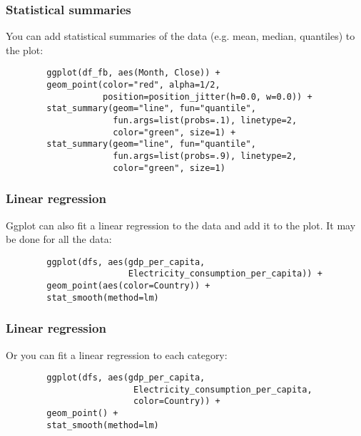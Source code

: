 \documentclass{beamer}
\begin{document}
	\begin{frame}[fragile]
		\frametitle{Statistical summaries}

		You can add statistical summaries of the data (e.g. mean, median, quantiles) to the plot:

		\vspace{2em}
	
		\begin{exampleblock}{}
		\begin{BVerbatim}
		ggplot(df_fb, aes(Month, Close)) + 
		geom_point(color="red", alpha=1/2,
		           position=position_jitter(h=0.0, w=0.0)) +
		stat_summary(geom="line", fun="quantile",
		             fun.args=list(probs=.1), linetype=2,
		             color="green", size=1) +
		stat_summary(geom="line", fun="quantile",
		             fun.args=list(probs=.9), linetype=2,
		             color="green", size=1)
		\end{BVerbatim}
		\end{exampleblock}{}

	\end{frame}

	\begin{frame}[fragile]
		\frametitle{Linear regression}

		Ggplot can also fit a linear regression to the data and add it to the plot. It may be done for all the data:

		\vspace{2em}
	
		\begin{exampleblock}{}
		\begin{BVerbatim}
		ggplot(dfs, aes(gdp_per_capita,
		                Electricity_consumption_per_capita)) +
		geom_point(aes(color=Country)) +
		stat_smooth(method=lm)
		\end{BVerbatim}
		\end{exampleblock}{}

	\end{frame}

	\begin{frame}[fragile]
		\frametitle{Linear regression}

		Or you can fit a linear regression to each category:

		\vspace{2em}
	
		\begin{exampleblock}{}
		\begin{BVerbatim}
		ggplot(dfs, aes(gdp_per_capita,
		                 Electricity_consumption_per_capita,
		                 color=Country)) +
		geom_point() +
		stat_smooth(method=lm)
		\end{BVerbatim}
		\end{exampleblock}{}

	\end{frame}
\end{document}
